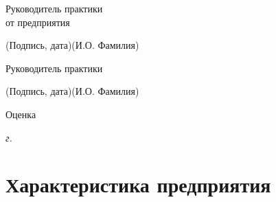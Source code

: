 \documentclass[14pt, russian]{scrartcl}
\begin{document}
\begin{titlepage}
\bigskip

\noindent \parbox{0.333\textwidth}{Руководитель практики\\от предприятия}
\hfill \underline{\hspace{4cm}}\quad \underline{\hspace{4cm}}

\vspace{-2ex}
\noindent\hspace{13.5ex}\normalsize\hspace{170pt}\hspace{2ex}\scriptsize{(Подпись, дата)}\normalsize\hspace{30pt}\hspace{6ex}\scriptsize{(И.О. Фамилия)}\normalsize


\bigskip

\noindent Руководитель практики  \hfill \underline{\hspace{4cm}}\quad
\underline{\hspace{4cm}}

\vspace{-2ex}
\noindent\hspace{13.5ex}\normalsize\hspace{170pt}\hspace{2ex}\scriptsize{(Подпись, дата)}\normalsize\hspace{30pt}\hspace{6ex}\scriptsize{(И.О. Фамилия)}\normalsize

\vspace{2ex}
\noindent Оценка\hfill\underline{\hspace{195pt}}

\vfill




\begin{center}
\textsl{\the\year{} г.}
\end{center}
\end{titlepage}

\setlength{\tabcolsep}{3pt}
\newpage
\setcounter{page}{2}
\renewcommand\contentsname{\hfill{\normalfont{СОДЕРЖАНИЕ}}\hfill}  %
\tableofcontents
\newpage
\section{Характеристика предприятия}
\end{document}
